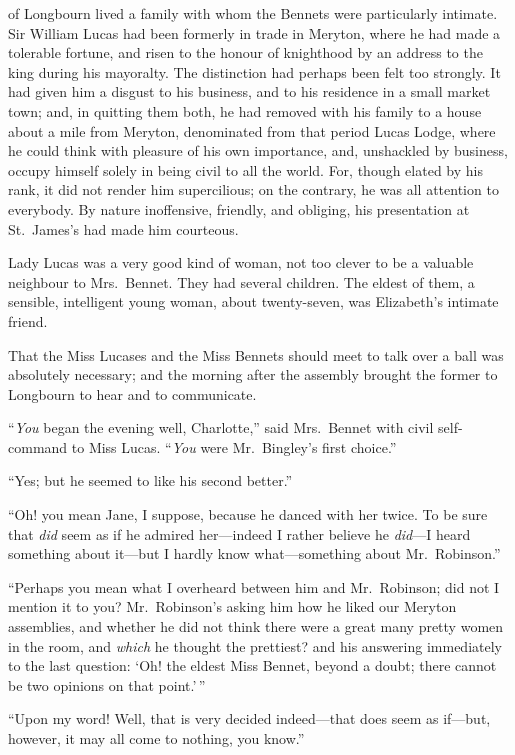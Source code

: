  of Longbourn lived a family with whom
the Bennets were particularly intimate.  Sir William Lucas
had been formerly in trade in Meryton, where he had made a
tolerable fortune, and risen to the honour of knighthood by an
address to the king during his mayoralty.  The distinction had
perhaps been felt too strongly.  It had given him a disgust
to his business, and to his residence in a small market town;
and, in quitting them both, he had removed with his family
to a house about a mile from Meryton, denominated from that
period Lucas Lodge, where he could think with pleasure of his
own importance, and, unshackled by business, occupy himself
solely in being civil to all the world.  For, though elated by his
rank, it did not render him supercilious; on the contrary, he was
all attention to everybody.  By nature inoffensive, friendly, and
obliging, his presentation at St.\ James's had made him courteous.

Lady Lucas was a very good kind of woman, not too clever to
be a valuable neighbour to Mrs.\ Bennet.  They had several
children.  The eldest of them, a sensible, intelligent young
woman, about twenty-seven, was Elizabeth's intimate friend.

That the Miss Lucases and the Miss Bennets should meet to
talk over a ball was absolutely necessary; and the morning after
the assembly brought the former to Longbourn to hear and to
communicate.

``\emph{You} began the evening well, Charlotte,'' said Mrs.\ Bennet with
civil self-command to Miss Lucas.  ``\emph{You} were Mr.\ Bingley's
first choice.''

``Yes; but he seemed to like his second better.''

``Oh! you mean Jane, I suppose, because he danced with her
twice.  To be sure that \emph{did} seem as if he admired her---indeed
I rather believe he \emph{did}---I heard something about it---but I
hardly know what---something about Mr.\ Robinson.''

``Perhaps you mean what I overheard between him and Mr.\ Robinson;
did not I mention it to you?  Mr.\ Robinson's asking him how he
liked our Meryton assemblies, and whether he did not think there
were a great many pretty women in the room, and \emph{which} he thought
the prettiest? and his answering immediately to the last
question: `Oh! the eldest Miss Bennet, beyond a doubt; there
cannot be two opinions on that point.'\,''

``Upon my word!  Well, that is very decided indeed---that does
seem as if---but, however, it may all come to nothing, you know.''

